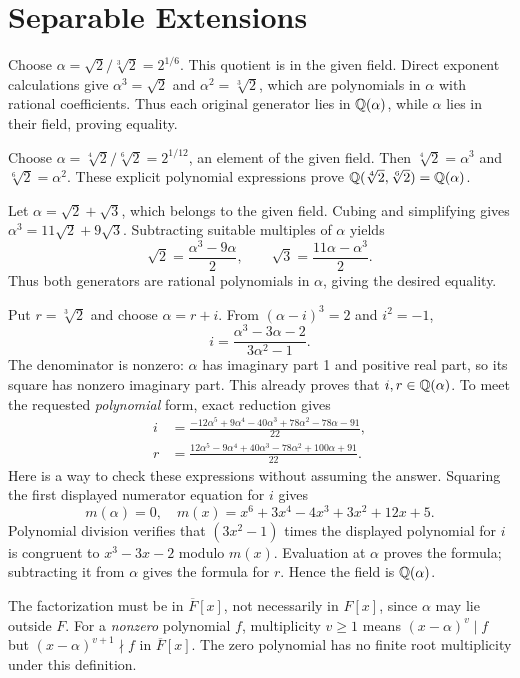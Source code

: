 \section{Separable Extensions}

Choose $\alpha=\sqrt2/\sqrt[3]2=2^{1/6}$. This quotient is in the given field. Direct exponent calculations give $\alpha^3=\sqrt2$ and $\alpha^2=\sqrt[3]2$, which are polynomials in $\alpha$ with rational coefficients. Thus each original generator lies in $\mathbb{Q}(\alpha)$, while $\alpha$ lies in their field, proving equality.

Choose $\alpha=\sqrt[4]2/\sqrt[6]2=2^{1/12}$, an element of the given field. Then $\sqrt[4]2=\alpha^3$ and $\sqrt[6]2=\alpha^2$. These explicit polynomial expressions prove $\mathbb{Q}(\sqrt[4]2,\sqrt[6]2)=\mathbb{Q}(\alpha)$.

Let $\alpha=\sqrt2+\sqrt3$, which belongs to the given field. Cubing and simplifying gives $\alpha^3=11\sqrt2+9\sqrt3$. Subtracting suitable multiples of $\alpha$ yields
\[\sqrt2=\frac{\alpha^3-9\alpha}{2},\qquad\sqrt3=\frac{11\alpha-\alpha^3}{2}.\]
Thus both generators are rational polynomials in $\alpha$, giving the desired equality.

Put $r=\sqrt[3]2$ and choose $\alpha=r+i$. From $(\alpha-i)^3=2$ and $i^2=-1$,
\[i=\frac{\alpha^3-3\alpha-2}{3\alpha^2-1}.\]
The denominator is nonzero: $\alpha$ has imaginary part 1 and positive real part, so its square has nonzero imaginary part. This already proves that $i,r\in\mathbb{Q}(\alpha)$. To meet the requested \emph{polynomial} form, exact reduction gives
\begin{align*}
i&=\frac{-12\alpha^5+9\alpha^4-40\alpha^3+78\alpha^2-78\alpha-91}{22},\\
r&=\frac{12\alpha^5-9\alpha^4+40\alpha^3-78\alpha^2+100\alpha+91}{22}.
\end{align*}
Here is a way to check these expressions without assuming the answer. Squaring the first displayed numerator equation for $i$ gives
\[m(\alpha)=0,\quad m(x)=x^6+3x^4-4x^3+3x^2+12x+5.\]
Polynomial division verifies that $(3x^2-1)$ times the displayed polynomial for $i$ is congruent to $x^3-3x-2$ modulo $m(x)$. Evaluation at $\alpha$ proves the formula; subtracting it from $\alpha$ gives the formula for $r$. Hence the field is $\mathbb{Q}(\alpha)$.

The factorization must be in $\overline F[x]$, not necessarily in $F[x]$, since $\alpha$ may lie outside $F$. For a \emph{nonzero} polynomial $f$, multiplicity $v\ge1$ means $(x-\alpha)^v\mid f$ but $(x-\alpha)^{v+1}\nmid f$ in $\overline F[x]$. The zero polynomial has no finite root multiplicity under this definition.


